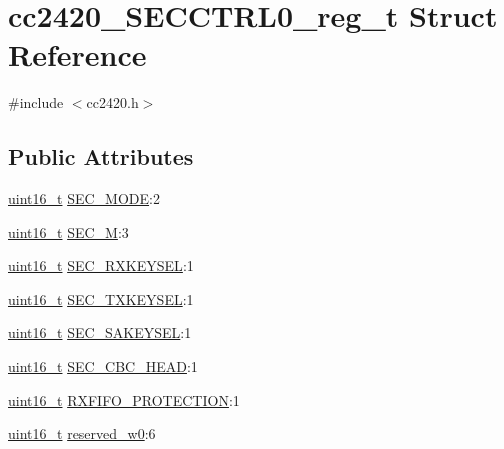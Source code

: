 \hypertarget{structcc2420___s_e_c_c_t_r_l0__reg__t}{}\section{cc2420\+\_\+\+S\+E\+C\+C\+T\+R\+L0\+\_\+reg\+\_\+t Struct Reference}
\label{structcc2420___s_e_c_c_t_r_l0__reg__t}


{\ttfamily \#include $<$cc2420.\+h$>$}

\subsection*{Public Attributes}
\begin{DoxyCompactItemize}
\item 
\hyperlink{_p_e___types_8h_a1f1825b69244eb3ad2c7165ddc99c956}{uint16\+\_\+t} \hyperlink{structcc2420___s_e_c_c_t_r_l0__reg__t_a37d9e58e09429cf8491fa940e15f2de2}{S\+E\+C\+\_\+\+M\+O\+DE}\+:2
\item 
\hyperlink{_p_e___types_8h_a1f1825b69244eb3ad2c7165ddc99c956}{uint16\+\_\+t} \hyperlink{structcc2420___s_e_c_c_t_r_l0__reg__t_ad5214011983812e07f3cda2ba4cf083b}{S\+E\+C\+\_\+M}\+:3
\item 
\hyperlink{_p_e___types_8h_a1f1825b69244eb3ad2c7165ddc99c956}{uint16\+\_\+t} \hyperlink{structcc2420___s_e_c_c_t_r_l0__reg__t_a1e790fdbb213abdac47b1deb42012ed2}{S\+E\+C\+\_\+\+R\+X\+K\+E\+Y\+S\+EL}\+:1
\item 
\hyperlink{_p_e___types_8h_a1f1825b69244eb3ad2c7165ddc99c956}{uint16\+\_\+t} \hyperlink{structcc2420___s_e_c_c_t_r_l0__reg__t_a2ad0689705838efbe91aeec2f72d5f63}{S\+E\+C\+\_\+\+T\+X\+K\+E\+Y\+S\+EL}\+:1
\item 
\hyperlink{_p_e___types_8h_a1f1825b69244eb3ad2c7165ddc99c956}{uint16\+\_\+t} \hyperlink{structcc2420___s_e_c_c_t_r_l0__reg__t_a63964c08e9b4c830a4096bcbf0a29042}{S\+E\+C\+\_\+\+S\+A\+K\+E\+Y\+S\+EL}\+:1
\item 
\hyperlink{_p_e___types_8h_a1f1825b69244eb3ad2c7165ddc99c956}{uint16\+\_\+t} \hyperlink{structcc2420___s_e_c_c_t_r_l0__reg__t_a05e88e7ae6d2f70ddb752fb8a33ad200}{S\+E\+C\+\_\+\+C\+B\+C\+\_\+\+H\+E\+AD}\+:1
\item 
\hyperlink{_p_e___types_8h_a1f1825b69244eb3ad2c7165ddc99c956}{uint16\+\_\+t} \hyperlink{structcc2420___s_e_c_c_t_r_l0__reg__t_a0e50095e6a29023641e076b49731887c}{R\+X\+F\+I\+F\+O\+\_\+\+P\+R\+O\+T\+E\+C\+T\+I\+ON}\+:1
\item 
\hyperlink{_p_e___types_8h_a1f1825b69244eb3ad2c7165ddc99c956}{uint16\+\_\+t} \hyperlink{structcc2420___s_e_c_c_t_r_l0__reg__t_a8ad3bc8cdc92cf6c86a16df3dfc7eb89}{reserved\+\_\+w0}\+:6
\end{DoxyCompactItemize}



